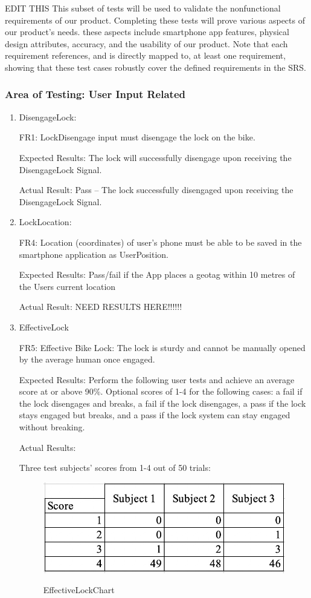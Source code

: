 \documentclass[12pt, titlepage]{article}
\begin{document}
EDIT THIS This subset of tests will be used to validate the nonfunctional requirements of our product. Completing these tests will prove various aspects of our product's needs. these aspects include smartphone app features, physical design attributes, accuracy, and the usability of our product. Note that each requirement references, and is directly mapped to, at least one requirement, showing that these test cases robustly cover the defined requirements in the SRS.

\subsubsection{Area of Testing: User Input Related}

\begin{enumerate}

\item{DisengageLock: 

FR1: LockDisengage input must disengage the lock on the bike. } 

Expected Results: The lock will successfully disengage upon receiving the DisengageLock Signal. 

Actual Result: Pass -- The lock successfully disengaged upon receiving the DisengageLock Signal. 
 
\item{LockLocation: 

FR4: Location (coordinates) of user’s phone must be able to be saved in the smartphone application as UserPosition. } 

Expected Results: Pass/fail if the App places a geotag within 10 metres of the Users current location 

Actual Result: NEED RESULTS HERE!!!!!!

\item{EffectiveLock

FR5: Effective Bike Lock: The lock is sturdy and cannot be manually opened by the average human once engaged. }

Expected Results: Perform the following user tests and achieve an average score at or above 90\%. Optional scores of 1-4 for the following cases: a fail if the lock disengages and breaks, a fail if the lock disengages, a pass if the lock stays engaged but breaks, and a pass if the lock system can stay engaged without breaking. 

Actual Results:

Three test subjects’ scores from 1-4 out of 50 trials: 
 \begin{figure}[h!]
 \begin{center}
 {
 \includegraphics[width=0.8\linewidth]{EffectiveLockChart}
 }
 \caption{\label{EffectiveLockChart} EffectiveLockChart}
 \end{center}
 \end{figure}


\end{enumerate}
\end{document}
